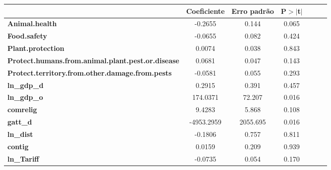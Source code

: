 \begin{center}
\begin{tabular}{lcccccc}
                                                          & \textbf{Coeficiente} & \textbf{Erro padrão} &\textbf{P$> |$t$|$}\\
\midrule
\textbf{Animal.health}                                    &      -0.2655  &        0.144     &        0.065\\
\textbf{Food.safety}                                      &      -0.0655  &        0.082     &        0.424\\
\textbf{Plant.protection}                                 &       0.0074  &        0.038     &        0.843\\
\textbf{Protect.humans.from.animal.plant.pest.or.disease} &       0.0681  &        0.047     &        0.143\\
\textbf{Protect.territory.from.other.damage.from.pests}   &      -0.0581  &        0.055     &        0.293\\
\textbf{ln\_gdp\_d}                                       &       0.2915  &        0.391     &        0.457\\
\textbf{ln\_gdp\_o}                                       &     174.0371  &       72.207     &        0.016\\
\textbf{comrelig}                                         &       9.4283  &        5.868     &        0.108\\
\textbf{gatt\_d}                                          &   -4953.2959  &     2055.695     &        0.016\\
\textbf{ln\_dist}                                         &      -0.1806  &        0.757     &        0.811\\
\textbf{contig}                                           &       0.0159  &        0.209     &        0.939\\
\textbf{ln\_Tariff}                                       &      -0.0735  &        0.054     &        0.170\\
\bottomrule
\end{tabular}
\end{center}